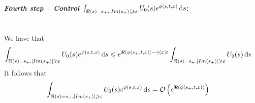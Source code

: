 \medskip
\paragraph{\textit{Fourth step -- Control $\int_{\Re(s) = s_+, |Im(s_+)| \geqslant \varepsilon} U_0(s) e^{\phi(s, t, x)} \, \mathrm ds$}:}\mbox{}\\
We have that 
\begin{align*}
    \int_{\Re(s) = s_+, |Im(s_+)| \geqslant \varepsilon} U_0(s) e^{\phi(s, t, x)}
    \, \mathrm ds 
    &\leqslant  e^{\Re(\phi(s_+, t, x)) - \gamma(\varepsilon)t} \int_{\Re(s) = s_+, |Im(s_+)| \geqslant \varepsilon} U_0(s) \, \mathrm ds \\
\end{align*}
It follows that 
\begin{align*}
    \int_{\Re(s) = s_+, |Im(s_+)| \geqslant \varepsilon} U_0(s) e^{\phi(s, t, x)} 
    \, \mathrm ds = \mathcal{O} \left( e^{\Re(\phi(s_+, t, x))} \right)
\end{align*}











